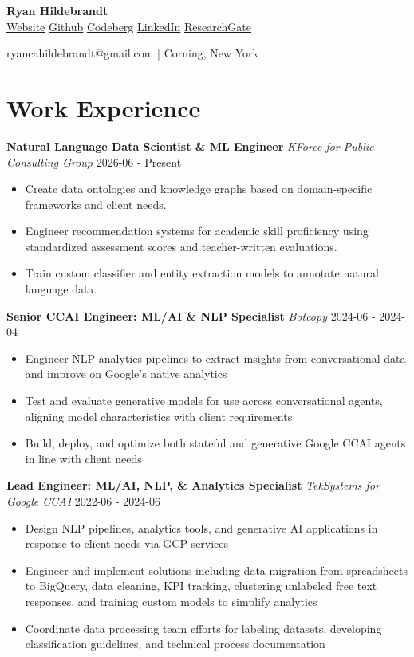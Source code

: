 \documentclass[a4paper,9pt]{extarticle}
\begin{document}
\begin{center}\textbf{\Large  Ryan Hildebrandt}\\[2pt]

\href{https://rcah.xyz}{Website} \href{https://github.com/ryancahildebrandt}{Github} \href{https://codeberg.org/ryancahildebrandt}{Codeberg} \href{https://linkedin.com/in/rcah}{LinkedIn} \href{https://researchgate.net/profile/Ryan-Hildebrandt}{ResearchGate} 

ryancahildebrandt@gmail.com | Corning, New York\end{center}


\section*{Work Experience}

\noindent
\textbf{Natural Language Data Scientist \& ML Engineer}
\noindent
\textit{KForce for Public Consulting Group} \hfill 2026-06 - Present
\begin{itemize}

\item Create data ontologies and knowledge graphs based on domain-specific frameworks and client needs.
\item Engineer recommendation systems for academic skill proficiency using standardized assessment scores and teacher-written evaluations.
\item Train custom classifier and entity extraction models to annotate natural language data.
\end{itemize}

\noindent
\textbf{Senior CCAI Engineer: ML/AI \& NLP Specialist}
\noindent
\textit{Botcopy} \hfill 2024-06 - 2024-04
\begin{itemize}

\item Engineer NLP analytics pipelines to extract insights from conversational data and improve on Google's native analytics
\item Test and evaluate generative models for use across conversational agents, aligning model characteristics with client requirements
\item Build, deploy, and optimize both stateful and generative Google CCAI agents in line with client needs
\end{itemize}

\noindent
\textbf{Lead Engineer: ML/AI, NLP, \& Analytics Specialist}
\noindent
\textit{TekSystems for Google CCAI} \hfill 2022-06 - 2024-06
\begin{itemize}

\item Design NLP pipelines, analytics tools, and generative AI applications in response to client needs via GCP services
\item Engineer and implement solutions including data migration from spreadsheets to BigQuery, data cleaning, KPI tracking, clustering unlabeled free text responses, and training custom models to simplify analytics
\item Coordinate data processing team efforts for labeling datasets, developing classification guidelines, and technical process documentation
\end{itemize}
\end{document}
